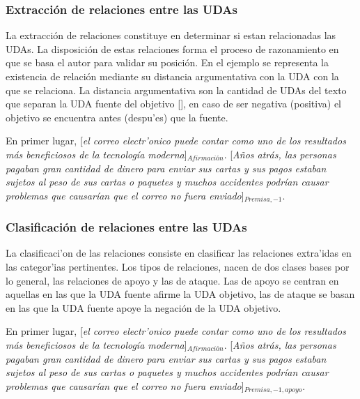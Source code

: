 \subsubsection{Extracción de relaciones entre las UDAs}

La extracción de relaciones constituye en determinar si estan relacionadas las UDAs. La disposición de estas
relaciones forma el proceso de razonamiento en que se basa el autor para validar su posición. En el ejemplo 
se representa la existencia de relación mediante su distancia argumentativa con la UDA con la que se relaciona.
La distancia argumentativa son la cantidad de UDAs del texto que separan la UDA fuente del objetivo [\cite{galassi2018argumentative}], 
en caso de ser negativa (positiva) el objetivo se encuentra antes (despu'es) que la fuente.

\begin{adjustwidth}{25pt}{25pt}
    En primer lugar, [\emph{el correo electr'onico puede contar como uno de los resultados
    más beneficiosos de la tecnología moderna}]$_{Afirmación}$. [\emph{Años atrás, las personas pagaban gran cantidad de dinero para 
    enviar sus cartas y sus pagos estaban sujetos al peso de sus cartas o paquetes y muchos accidentes podrían 
    causar problemas que causarían que el correo no fuera enviado}]$_{Premisa, -1}$.
\end{adjustwidth}

\subsubsection{Clasificación de relaciones entre las UDAs}

La clasificaci'on de las relaciones consiste en clasificar las relaciones extra'idas en las categor'ias pertinentes.
Los tipos de relaciones, nacen de dos clases bases por lo general, las relaciones de apoyo y las de ataque.
Las de apoyo se centran en aquellas en las que la UDA fuente afirme la UDA objetivo, las de ataque se basan en 
las que la UDA fuente apoye la negación de la UDA objetivo.

\begin{adjustwidth}{25pt}{25pt}
    En primer lugar, [\emph{el correo electr'onico puede contar como uno de los resultados
    más beneficiosos de la tecnología moderna}]$_{Afirmación}$. [\emph{Años atrás, las personas pagaban gran cantidad de dinero para 
    enviar sus cartas y sus pagos estaban sujetos al peso de sus cartas o paquetes y muchos accidentes podrían 
    causar problemas que causarían que el correo no fuera enviado}]$_{Premisa, -1, apoyo}$.
\end{adjustwidth}

